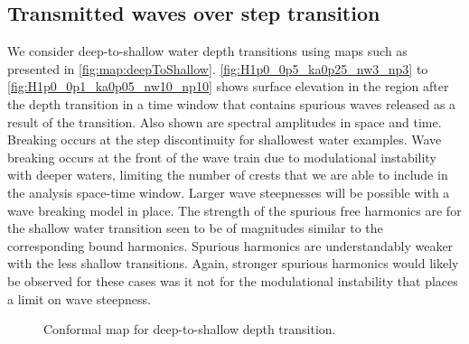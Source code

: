 \subsection{Transmitted waves over step transition}

We consider deep-to-shallow water depth transitions using maps such as presented in \autoref{fig:map:deepToShallow}.
\autoref{fig:H1p0_0p5_ka0p25_nw3_np3} to \ref{fig:H1p0_0p1_ka0p05_nw10_np10} shows surface elevation in the region after the depth transition in a time window that contains spurious waves released as a result of the transition.
Also shown are spectral amplitudes in space and time.
Breaking occurs at the step discontinuity for shallowest water examples. 
Wave breaking occurs at the front of the wave train due to modulational instability with deeper waters, limiting the number of crests that we are able to include in the analysis space-time window. Larger wave steepnesses will be possible with a wave breaking model in place. 
The strength of the spurious free harmonics are for the shallow water transition seen to be of magnitudes similar to the corresponding bound harmonics. 
Spurious harmonics are understandably weaker with the less shallow transitions. Again, stronger spurious harmonics would likely be observed for these cases was it not for the modulational instability that places a limit on wave steepness.



\begin{figure}[H]%
\centering
{}%
%
\caption{Conformal map for deep-to-shallow depth transition.}%
\label{fig:map:deepToShallow}%
\end{figure}


